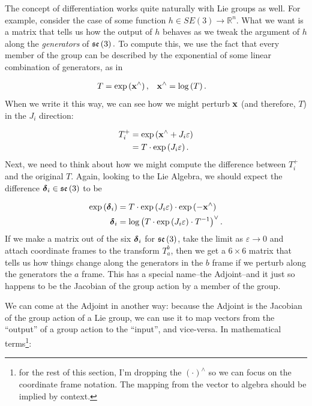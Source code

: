 
\label{sec:ad_as_jacobian}



The concept of differentiation works quite naturally with Lie groups
as well. For example, consider the case of some function $h\in SE(3)\to\mathbb{R}^{n}.$
What we want is a matrix that tells us how the output of $h$ behaves
as we tweak the argument of $h$ along the \emph{generators }of $\mathfrak{se}\left(3\right).$
To compute this, we use the fact that every member of the group can
be described by the exponential of some linear combination of generators,
as in

\begin{align*}
T & =\exp\left(\mathbf{x}^{\wedge}\right), & \mathbf{x}^{\wedge} & =\log\left(T\right).
\end{align*}
When we write it this way, we can see how we might perturb $\mathbf{x}$ (and
therefore, $T$) in the $J_{i}$ direction:

\begin{align*}
T_{i}^{+} & =\exp\left(\mathbf{x}^{\wedge}+J_{i}\varepsilon\right)\\
 & =T\cdot\exp\left(J_{i}\varepsilon\right).
\end{align*}
Next, we need to think about how we might compute the difference between
$T_{i}^{+}$ and the original $T$. Again, looking to the Lie Algebra,
we should expect the difference $\boldsymbol{\delta}_{i}\in\mathfrak{se}\left(3\right)$ to
be

\begin{align}
\exp\left(\deltabf_{i}\right) & =T\cdot\exp\left(J_{i}\varepsilon\right)\cdot\exp\left(-\xbf^{\wedge}\right)\nonumber \\
\deltabf_{i} & =\log\left(T\cdot\exp\left(J_{i}\varepsilon\right)\cdot T^{-1}\right)^{\vee}.\label{eq:adjoint_start}
\end{align}
If we make a matrix out of the six $\boldsymbol{\delta}_{i}$ for $\mathfrak{se}\left(3\right)$,
take the limit as $\varepsilon\to0$ and attach coordinate frames
to the transform $T_{a}^{b}$, then we get a $6\times6$ matrix that
tells us how things change along the generators in the $b$ frame
if we perturb along the generators the $a$ frame. This has a special
name--the Adjoint--and it just so happens to be the Jacobian of
the group action by a member of the group.

We can come at the Adjoint in another way: because the Adjoint is
the Jacobian of the group action of a Lie group, we can use it to
map vectors from the ``output'' of a group action to the ``input'',
and vice-versa. In mathematical terms\footnote{for the rest of this section, I'm dropping the $\left(\cdot\right)^{\wedge}$
so we can focus on the coordinate frame notation. The mapping from
the vector to algebra should be implied by context.}:

